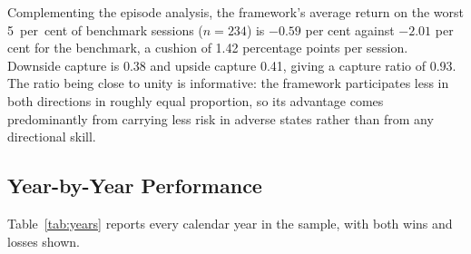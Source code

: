 \documentclass{singlecol-new}
\theoremstyle{TH}{
\newtheorem{lemma}{Lemma}
\newtheorem{theorem}[lemma]{Theorem}
\newtheorem{corrolary}[lemma]{Corrolary}
\newtheorem{conjecture}[lemma]{Conjecture}
\newtheorem{proposition}[lemma]{Proposition}
\newtheorem{claim}[lemma]{Claim}
\newtheorem{stheorem}[lemma]{Wrong Theorem}
\newtheorem{algorithm}{Algorithm}
}
\theoremstyle{THrm}{
\newtheorem{definition}{Definition}[section]
\newtheorem{question}{Question}[section]
\newtheorem{remark}{Remark}
\newtheorem{scheme}{Scheme}
}
\theoremstyle{THhit}{
\newtheorem{case}{Case}[section]
}
\begin{document}
Complementing the episode analysis, the framework's average return on the worst
5~per~cent of benchmark sessions ($n = 234$) is $-0.59$ per cent against $-2.01$ per
cent for the benchmark, a cushion of 1.42 percentage points per session. Downside
capture is 0.38 and upside capture 0.41, giving a capture ratio of 0.93. The ratio
being close to unity is informative: the framework participates less in both directions
in roughly equal proportion, so its advantage comes predominantly from carrying less
risk in adverse states rather than from any directional skill.

\subsection{Year-by-Year Performance}

Table~\ref{tab:years} reports every calendar year in the sample, with both wins and losses shown.
\end{document}
